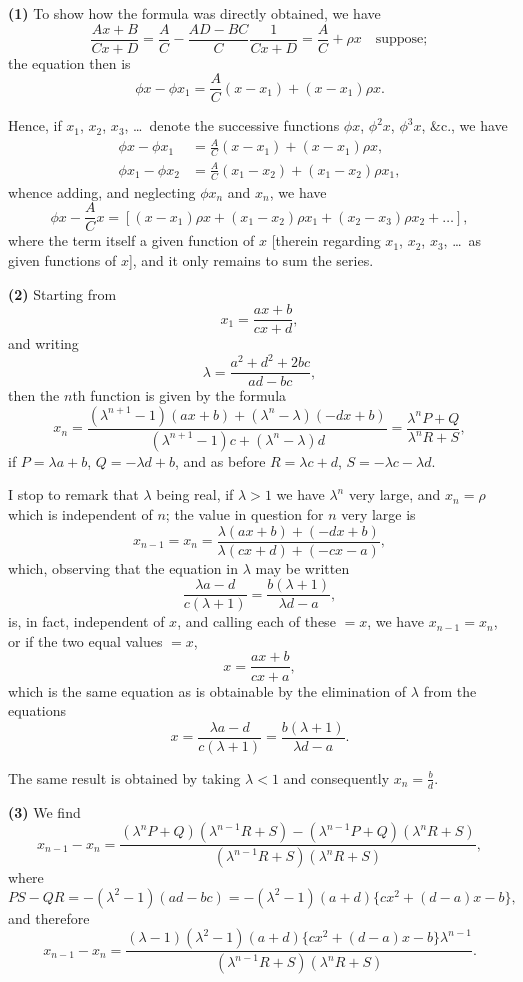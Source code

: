 \documentclass[11pt,a4paper]{book}
\begin{document}
\medskip
\noindent\textbf{(1)}\quad
To show how the formula was directly obtained, we have
\[
\frac{Ax + B}{Cx + D} = \frac{A}{C} - \frac{AD - BC}{C}\frac{1}{Cx + D}
= \frac{A}{C} + \rho x \quad \text{suppose};
\]
the equation then is
\[
\phi x - \phi x_1 = \frac{A}{C}(x - x_1) + (x - x_1)\rho x.
\]

Hence, if $x_1$, $x_2$, $x_3$, \dots\ denote the successive functions $\phi x$, $\phi^2 x$, $\phi^3 x$, \&c., we have
\begin{align*}
\phi x - \phi x_1 &= \frac{A}{C}(x - x_1) + (x - x_1)\rho x,\\
\phi x_1 - \phi x_2 &= \frac{A}{C}(x_1 - x_2) + (x_1 - x_2)\rho x_1,
\end{align*}
whence adding, and neglecting $\phi x_n$ and $x_n$, we have
\[
\phi x - \frac{A}{C}x = [(x - x_1)\rho x + (x_1 - x_2)\rho x_1 + (x_2 - x_3)\rho x_2 + \dots],
\]
where the term itself a given function of $x$ [therein regarding $x_1$, $x_2$, $x_3$, \dots\ as given functions of $x$], and it only remains to sum the series.

\medskip
\noindent\textbf{(2)}\quad
Starting from
\[
x_1 = \frac{ax + b}{cx + d},
\]
and writing
\[
\lambda = \frac{a^2 + d^2 + 2bc}{ad - bc},
\]
then the $n$th function is given by the formula
\[
x_n = \frac{(\lambda^{n+1} - 1)(ax + b) + (\lambda^n - \lambda)(-dx + b)}
{(\lambda^{n+1} - 1)c + (\lambda^n - \lambda)d}
= \frac{\lambda^n P + Q}{\lambda^n R + S},
\]
if $P = \lambda a + b$, $Q = -\lambda d + b$, and as before $R = \lambda c + d$, $S = -\lambda c - \lambda d$.

I stop to remark that $\lambda$ being real, if $\lambda > 1$ we have $\lambda^n$ very large, and $x_n = \rho$ which is independent of $n$; the value in question for $n$ very large is
\[
x_{n-1} = x_n = \frac{\lambda(ax + b) + (-dx + b)}{\lambda(cx + d) + (-cx - a)},
\]
which, observing that the equation in $\lambda$ may be written
\[
\frac{\lambda a - d}{c(\lambda + 1)} = \frac{b(\lambda + 1)}{\lambda d - a},
\]
is, in fact, independent of $x$, and calling each of these $= x$, we have $x_{n-1} = x_n$, or if the two equal values $= x$,
\[
x = \frac{ax + b}{cx + a},
\]
which is the same equation as is obtainable by the elimination of $\lambda$ from the equations
\[
x = \frac{\lambda a - d}{c(\lambda + 1)} = \frac{b(\lambda + 1)}{\lambda d - a}.
\]

The same result is obtained by taking $\lambda < 1$ and consequently $x_n = \frac{b}{d}$.

\medskip
\noindent\textbf{(3)}\quad
We find
\[
x_{n-1} - x_n = \frac{(\lambda^n P + Q)(\lambda^{n-1}R + S) - (\lambda^{n-1}P + Q)(\lambda^n R + S)}
{(\lambda^{n-1}R + S)(\lambda^n R + S)},
\]
where
\[
PS - QR = -(\lambda^2 - 1)(ad - bc) = -(\lambda^2 - 1)(a + d)\{cx^2 + (d - a)x - b\},
\]
and therefore
\[
x_{n-1} - x_n = \frac{(\lambda - 1)(\lambda^2 - 1)(a + d)\{cx^2 + (d - a)x - b\}\lambda^{n-1}}
{(\lambda^{n-1}R + S)(\lambda^n R + S)}.
\]
\end{document}
